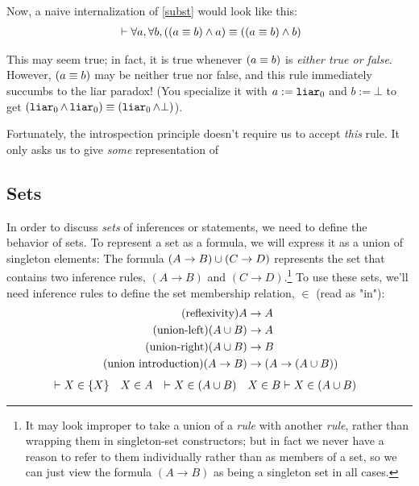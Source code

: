 \documentclass{article}
\begin{document}
  
  Now, a naive internalization of \eqref{subst} would look like this:
  \begin{align*}
    &\vdash \forall a, \forall b, ((a \equiv b) \wedge a) \equiv ((a \equiv b) \wedge b) \\
  \end{align*}
  
  This may seem true; in fact, it is true whenever $(a \equiv b)$ is \emph{either true or false}. However, $(a \equiv b)$ may be neither true nor false, and this rule immediately succumbs to the liar paradox! (You specialize it with $a := \operatorname{\texttt{liar}}_0$ and $b := \bot$ to get $(\operatorname{\texttt{liar}}_0 \wedge \operatorname{\texttt{liar}}_0) \equiv (\operatorname{\texttt{liar}}_0 \wedge \bot)$).
  
  Fortunately, the introspection principle doesn't require us to accept \emph{this} rule. It only asks us to give \emph{some} representation of
  
  \subsection{Sets}
  
  In order to discuss \emph{sets} of inferences or statements, we need to define the behavior of sets. To represent a set as a formula, we will express it as a union of singleton elements: The formula $(A \to B) \cup (C \to D)$ represents the set that contains two inference rules, $(A \to B)$ and $(C \to D)$.\footnote{It may look improper to take a union of a \emph{rule} with another \emph{rule}, rather than wrapping them in singleton-set constructors; but in fact we never have a reason to refer to them individually rather than as members of a set, so we can just view the formula $(A \to B)$ as being a singleton set in all cases.} To use these sets, we'll need inference rules to define the set membership relation, $\in$ (read as "in"):
  \begin{align*}
    \tag{reflexivity}
    A &\to A\\
    \tag{union-left}
    (A \cup B) &\to A\\
    \tag{union-right}
    (A \cup B) &\to B\\
    \tag{union introduction}
    (A \to B) &\to (A \to (A \cup B))\\
  \end{align*}
  \iffalse
  \begin{align*}
    &\vdash X \in \{X\} &&
    X \in A &\vdash X \in (A \cup B) &&
    X \in B &\vdash X \in (A \cup B)
  \end{align*}
\end{document}
